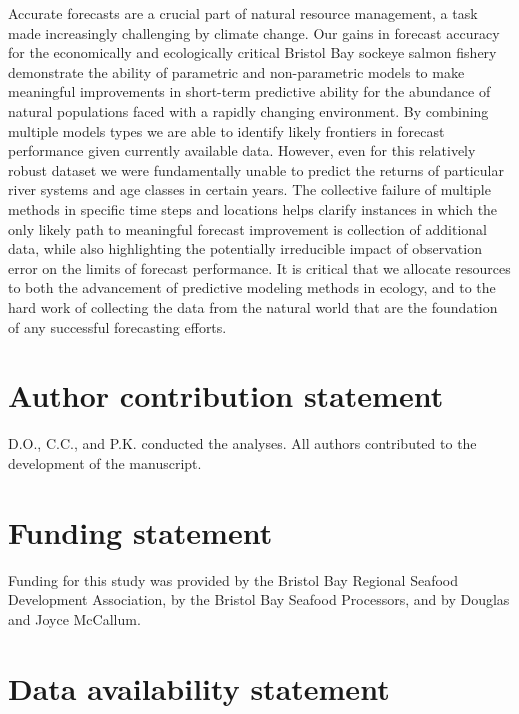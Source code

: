\documentclass[
]{article}
\begin{document}
Accurate forecasts are a crucial part of natural resource management, a task made increasingly challenging by climate change. Our gains in forecast accuracy for the economically and ecologically critical Bristol Bay sockeye salmon fishery demonstrate the ability of parametric and non-parametric models to make meaningful improvements in short-term predictive ability for the abundance of natural populations faced with a rapidly changing environment. By combining multiple models types we are able to identify likely frontiers in forecast performance given currently available data. However, even for this relatively robust dataset we were fundamentally unable to predict the returns of particular river systems and age classes in certain years. The collective failure of multiple methods in specific time steps and locations helps clarify instances in which the only likely path to meaningful forecast improvement is collection of additional data, while also highlighting the potentially irreducible impact of observation error on the limits of forecast performance. It is critical that we allocate resources to both the advancement of predictive modeling methods in ecology, and to the hard work of collecting the data from the natural world that are the foundation of any successful forecasting efforts.

\hypertarget{author-contribution-statement}{%
\section*{Author contribution statement}\label{author-contribution-statement}}

D.O., C.C., and P.K. conducted the analyses. All authors contributed to the development of the manuscript.

\hypertarget{funding-statement}{%
\section*{Funding statement}\label{funding-statement}}

Funding for this study was provided by the Bristol Bay Regional Seafood Development Association, by the Bristol Bay Seafood Processors, and by Douglas and Joyce McCallum.

\hypertarget{data-availability-statement}{%
\section*{Data availability statement}\label{data-availability-statement}}
\end{document}
